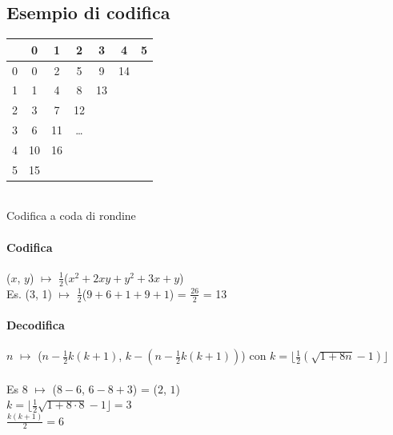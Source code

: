 \documentclass[10pt]{book}
\begin{document}
\subsection{Esempio di codifica}
\begin{multicols}{2}
\begin{center}
	\begin{tabular}{c || c | c | c | c | c | c}
	 & 0 & 1 & 2 & 3 & 4 & 5 \\
	 \hline
	 \hline
	 0 & 0 & 2 & 5 & 9 & 14 & \\
	 \hline
	 1 & 1 & 4 & 8 & 13 & & \\
	 \hline
	 2 & 3 & 7 & 12 & & & \\
	 \hline
	 3 & 6 & 11 & \ldots & & & \\
	 \hline
	 4 & 10 & 16 & & & & \\
	 \hline
	 5 & 15 & & & & & 
	\end{tabular}\\
	Codifica a coda di rondine
\end{center}
\paragraph{Codifica} ($x$, $y$) $\mapsto$ $\frac{1}{2}$($x^2 + 2xy + y^2 + 3x + y$)\\
Es. (3, 1) $\mapsto$ $\frac{1}{2}$($9 + 6 + 1 + 9 + 1$) = $\frac{26}{2}$ = 13
\paragraph{Decodifica} $n$ $\mapsto$ ($n - \frac{1}{2}k(k + 1)$, $k - (n - \frac{1}{2}k(k+1))$) con $k = \lfloor\frac{1}{2}(\sqrt{1 + 8n} -1)\rfloor$\\\\
Es 8 $\mapsto$ ($8 - 6$, $6 - 8 + 3$) = ($2$, $1$)\\
$k = \lfloor\frac{1}{2}\sqrt{1 + 8\cdot 8} - 1\rfloor = 3$\\
$\frac{k(k+1)}{2} = 6$
\end{multicols}
\end{document}
